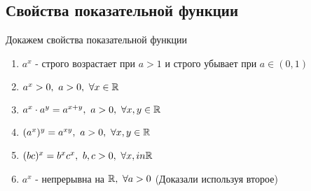 \subsection{Свойства показательной функции}



\begin{theorem} Докажем свойства показательной функции
\begin{enumerate}
    \item $a^x$ - строго возрастает при $a > 1$ и строго убывает при $a \in (0, 1)$
    \item $a^x > 0, \ a > 0, \  \forall x \in \mathbb{R}$
    \item $a^x \cdot a^y = a^{x + y}, \ a > 0, \ \forall x, y \in \mathbb{R}$
    \item $(a^x)^y = a^{xy}, \ a > 0, \ \forall x, y \in \R$
    \item $(bc)^x = b^x c^x, \ b, c > 0, \ \forall x, in \R$
    \item $a^x$ - непрерывна на $\mathbb{R}, \ \forall a > 0$ (Доказали используя второе)
\end{enumerate}
\end{theorem}

